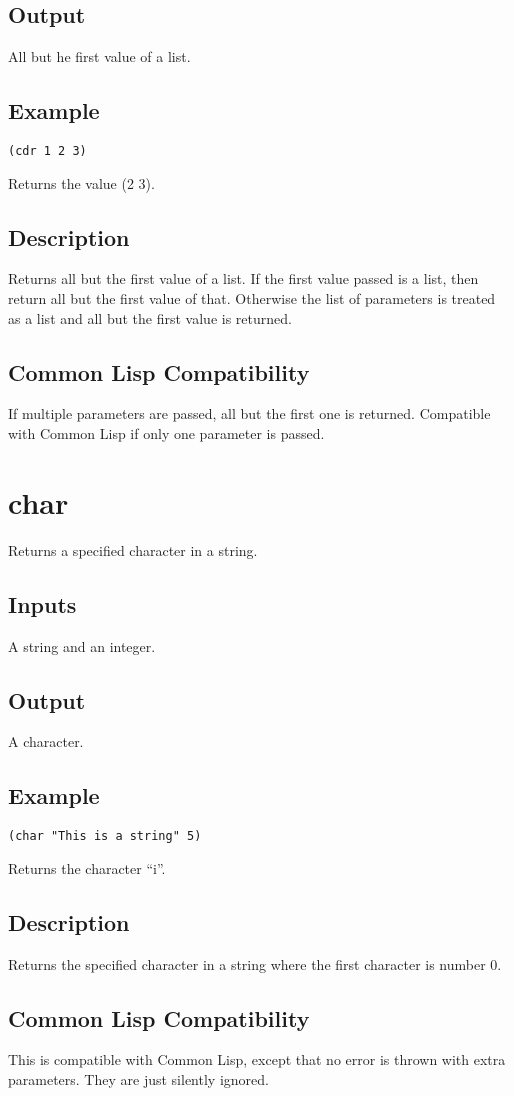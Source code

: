 \documentclass[10pt, openany]{book}
\newcommand{\cl}{Common Lisp}
\begin{document}
\subsection{Output}
All but he first value of a list.
\subsection{Example}
\begin{lstlisting}
(cdr 1 2 3)
\end{lstlisting}
Returns the value (2 3).
\subsection{Description}
Returns all but the first value of a list.  If the first value passed is a list, then return all but the first value of that.  Otherwise the list of parameters is treated as a list and all but the first value is returned.
\subsection{Common Lisp Compatibility}
If multiple parameters are passed, all but the first one is returned.  Compatible with \cl{} if only one parameter is passed.

\section{char}
Returns a specified character in a string.
\subsection{Inputs}
A string and an integer.
\subsection{Output}
A character.
\subsection{Example}
\begin{lstlisting}
(char "This is a string" 5)
\end{lstlisting}
Returns the character ``i''.
\subsection{Description}
Returns the specified character in a string where the first character is number 0.
\subsection{Common Lisp Compatibility}
This is compatible with \cl, except that no error is thrown with extra parameters.  They are just silently ignored.
\end{document}
